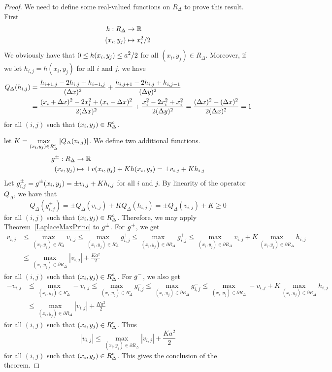 \begin{proof}
We need to define some real-valued functions on $R_\Delta$ to prove
this result.  First
\begin{align*}
  h : R_\Delta & \to \mathbb{R} \\
  (x_i,y_j) & \mapsto x_i^2/2
\end{align*}
We obviously have that $\displaystyle 0 \leq h(x_i,y_j) \leq a^2/2$ for all
$(x_i,y_j) \in R_\Delta$.  Moreover, if we let $h_{i,j} = h(x_i,y_j)$
for all $i$ and $j$, we have
\begin{align*}
  Q_\Delta(h_{i,j})
&= \frac{h_{i+1,j} - 2h_{i,j} + h_{i-1,j}}{(\Delta{x})^2}
+ \frac{h_{i,j+1} - 2h_{i,j} + h_{i,j-1}}{(\Delta{y})^2} \\
&= \frac{(x_i+\Delta{x})^2 - 2x_i^2 + (x_i-\Delta{x})^2}{2(\Delta{x})^2}
+ \frac{x_i^2 - 2x_i^2 + x_i^2}{2(\Delta{y})^2}
= \frac{(\Delta{x})^2 + (\Delta{x})^2}{2(\Delta{x})^2}
= 1
\end{align*}
for all $(i,j)$ such that $\displaystyle (x_i,y_j) \in R^\circ_\Delta$.

let
$\displaystyle
K = \max_{(x_i,y_j) \in R^\circ_\Delta} \left| Q_\Delta(v_{i,j})\right|$.
We define two additional functions.
\begin{align*}
  g^{\pm} : R_\Delta & \to \mathbb{R} \\
  (x_i,y_j) & \mapsto \pm v(x_i,y_j) + K h(x_i,y_j) = \pm v_{i,j} + K h_{i,j}
\end{align*}
Let $\displaystyle g_{i,j}^{\pm} = g^{\pm}(x_i,y_j) = \pm v_{i,j} + K h_{i,j}$ for
all $i$ and $j$.  By linearity of the operator $Q_\Delta$, we
have that
\[
Q_\Delta\left(g_{i,j}^{\pm}\right)
= \pm Q_\Delta(v_{i,j}) + K Q_\Delta(h_{i,j})
= \pm Q_\Delta(v_{i,j}) + K \geq 0
\]
for all $(i,j)$ such that $\displaystyle (x_i,y_j) \in R^\circ_\Delta$.
Therefore, we may apply Theorem~\ref{LaplaceMaxPrinc} to
$\displaystyle g^{\pm}$.  For $\displaystyle g^+$, we get
\begin{align*}
v_{i,j} & \leq \max_{(x_i,y_j) \in R^\circ_\Delta} v_{i,j}
\leq \max_{(x_i,y_j) \in R^\circ_\Delta} g^+_{i,j}
\leq \max_{(x_i,y_j) \in \partial R_\Delta} g^+_{i,j}
\leq \max_{(x_i,y_j) \in \partial R_\Delta} v_{i,j}
+ K \max_{(x_i,y_j) \in \partial R_\Delta} h_{i,j} \\
&\leq \max_{(x_i,y_j) \in \partial R_\Delta} |v_{i,j}| + \frac{K a^2}{2}
\end{align*}
for all $(i,j)$ such that $\displaystyle (x_i,y_j) \in R^\circ_\Delta$.
For $\displaystyle g^-$, we also get
\begin{align*}
-v_{i,j} & \leq \max_{(x_i,y_j) \in R^\circ_\Delta} -v_{i,j}
\leq \max_{(x_i,y_j) \in R^\circ_\Delta} g^-_{i,j}
\leq \max_{(x_i,y_j) \in \partial R_\Delta} g^-_{i,j}
\leq \max_{(x_i,y_j) \in \partial R_\Delta} -v_{i,j}
+ K \max_{(x_i,y_j) \in \partial R_\Delta} h_{i,j} \\
&\leq \max_{(x_i,y_j) \in \partial R_\Delta} |v_{i,j}| + \frac{K a^2}{2}
\end{align*}
for all $(i,j)$ such that $\displaystyle (x_i,y_j) \in R^\circ_\Delta$.
Thus
\[
|v_{i,j}| \leq \max_{(x_i,y_j) \in \partial R_\Delta} |v_{i,j}| + \frac{K a^2}{2}
\]
for all $(i,j)$ such that $\displaystyle (x_i,y_j) \in R^\circ_\Delta$.  This
gives the conclusion of the theorem.
\end{proof}


